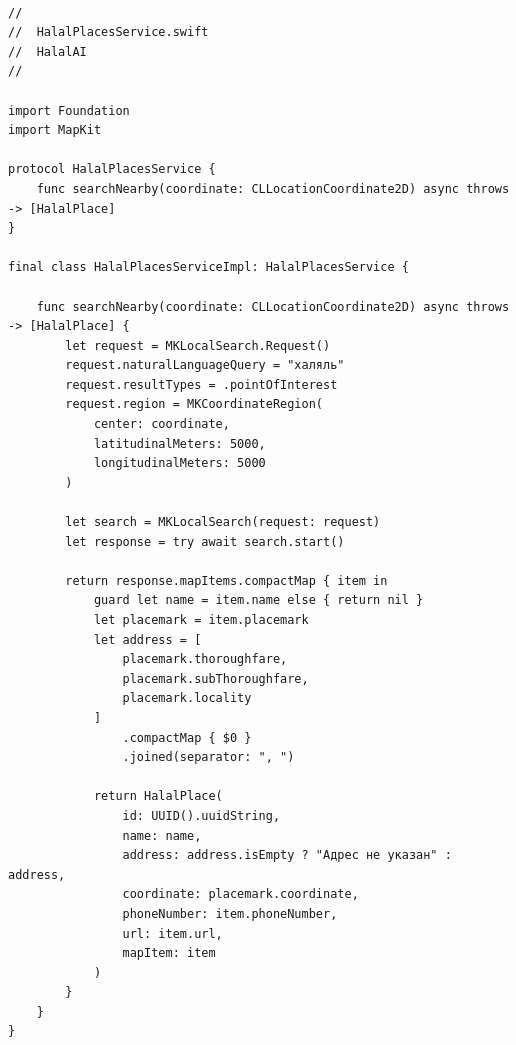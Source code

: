 \begin{lstlisting}[basicstyle=\tiny\ttfamily,breaklines=true]

//
//  HalalPlacesService.swift
//  HalalAI
//

import Foundation
import MapKit

protocol HalalPlacesService {
    func searchNearby(coordinate: CLLocationCoordinate2D) async throws -> [HalalPlace]
}

final class HalalPlacesServiceImpl: HalalPlacesService {

    func searchNearby(coordinate: CLLocationCoordinate2D) async throws -> [HalalPlace] {
        let request = MKLocalSearch.Request()
        request.naturalLanguageQuery = "халяль"
        request.resultTypes = .pointOfInterest
        request.region = MKCoordinateRegion(
            center: coordinate,
            latitudinalMeters: 5000,
            longitudinalMeters: 5000
        )

        let search = MKLocalSearch(request: request)
        let response = try await search.start()

        return response.mapItems.compactMap { item in
            guard let name = item.name else { return nil }
            let placemark = item.placemark
            let address = [
                placemark.thoroughfare,
                placemark.subThoroughfare,
                placemark.locality
            ]
                .compactMap { $0 }
                .joined(separator: ", ")

            return HalalPlace(
                id: UUID().uuidString,
                name: name,
                address: address.isEmpty ? "Адрес не указан" : address,
                coordinate: placemark.coordinate,
                phoneNumber: item.phoneNumber,
                url: item.url,
                mapItem: item
            )
        }
    }
}
\end{lstlisting}

